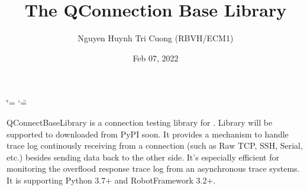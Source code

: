 \documentclass[letterpaper,10pt,english]{sphinxmanual}
\title{The QConnection Base Library}
\date{Feb 07, 2022}
\author{Nguyen Huynh Tri Cuong (RBVH/ECM1)}
\begin{document}
\ifdefined\shorthandoff
  \ifnum\catcode`\=\string=\active\shorthandoff{=}\fi
  \ifnum\catcode`\"=\active{}\fi
\fi

\pagestyle{empty}
\sphinxmaketitle
\pagestyle{plain}
\sphinxtableofcontents
\pagestyle{normal}
\label{\detokenize{index::doc}}


\sphinxAtStartPar
QConnectBaseLibrary is a connection testing library for . Library will be supported to
downloaded from PyPI soon. It provides a mechanism to handle trace log
continously receiving from a connection (such as Raw TCP, SSH, Serial,
etc.) besides sending data back to the other side. It’s especially
efficient for monitoring the overflood response trace log from an
asynchronous trace systems. It is supporting Python 3.7+ and
RobotFramework 3.2+.
\end{document}
